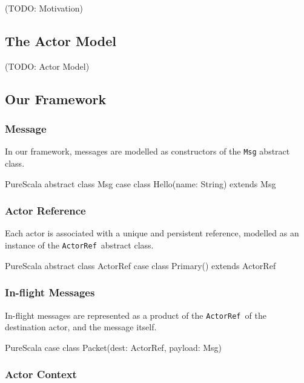 \documentclass[a4paper,twoside]{article}
\newcommand{\InlineS}[1]{\lstinline[language=PureScala,basicstyle=\small\ttfamily,columns=fixed]|#1|}
\newcommand{\TODO}[1]{\textcolor{YellowOrange}{(TODO: #1)}} %
\newcommand{\ActorRef}{\InlineS{ActorRef}\ }
\begin{document}
\TODO{Motivation}

\subsection{The Actor Model}

\TODO{Actor Model}

\subsection{Our Framework}

\subsubsection*{Message}

In our framework, messages are modelled as constructors of the \InlineS{Msg} abstract class.

\begin{ShortCode}{PureScala}
abstract class Msg
case class Hello(name: String) extends Msg
\end{ShortCode}

\vspace{-15pt}
\subsubsection*{Actor Reference}

Each actor is associated with a unique and persistent reference, modelled as an instance of the \ActorRef abstract class.

\begin{ShortCode}{PureScala}
abstract class ActorRef
case class Primary() extends ActorRef
\end{ShortCode}

\vspace{-15pt}
\subsubsection*{In-flight Messages}

In-flight messages are represented as a product of the \ActorRef of the destination actor, and the message itself.

\begin{ShortCode}{PureScala}
case class Packet(dest: ActorRef, payload: Msg)
\end{ShortCode}

\vspace{-15pt}
\subsubsection*{Actor Context}
\end{document}
